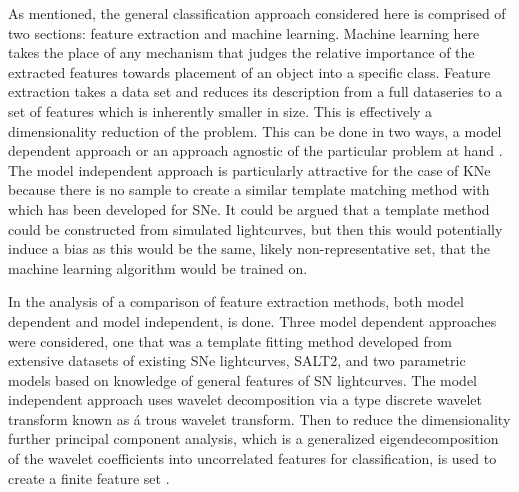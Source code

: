 \documentclass[12pt]{article}
\begin{document}
As mentioned, the general classification approach considered here is comprised of two sections: feature extraction and machine learning. Machine learning here takes the place of any mechanism that judges the relative importance of the extracted features towards placement of an object into a specific class. Feature extraction takes a data set and reduces its description from a full dataseries to a set of features which is inherently smaller in size. This is effectively a dimensionality reduction of the problem. This can be done in two ways, a model dependent approach or an approach agnostic of the particular problem at hand \citep{Lochner2016}. The model independent approach is particularly attractive for the case of KNe because there is no sample to create a similar template matching method with which has been developed for SNe. It could be argued that a template method could be constructed from simulated lightcurves, but then this would potentially induce a bias as this would be the same, likely non-representative set, that the machine learning algorithm would be trained on.\par
In the analysis of \cite{Lochner2016} a comparison of feature extraction methods, both model dependent and model independent, is done. Three model dependent approaches were considered, one that was a template fitting method developed from extensive datasets of existing SNe lightcurves, SALT2, and two parametric models based on knowledge of general features of SN lightcurves. The model independent approach uses wavelet decomposition via a type discrete wavelet transform known as \'a trous wavelet transform. Then to reduce the dimensionality further principal component analysis, which is a generalized eigendecomposition of the wavelet coefficients into uncorrelated features for classification, is used to create a finite feature set \citep{Lochner2016}. \par
\end{document}
